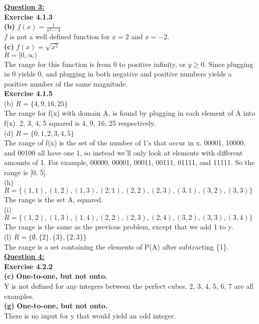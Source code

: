 \documentclass[12pt, letterpaper, twoside]{article}
\begin{document}
\noindent \textbf{\underline{Question 3:}}\\
\textbf{Exercise 4.1.3}\\
\textbf{(b)} $f(x) = \frac{1}{x^2 - 4}$\\
\break
$f$ is not a well defined function for $x = 2$ and $x = -2$.\\
\break
\textbf{(c)} $f(x) = \sqrt{x^2}$\\
\break
$R = [0, \infty)$\\
The range for this function is from 0 to positive infinity, or $y \geq 0$. Since plugging in 0 yields 0, and plugging in both negative and positive numbers yields a positive number of the same magnitude.\\
\break
\textbf{Exercise 4.1.5}\\
(b) $R = \{4, 9, 16, 25\}$\\
The range for f(x) with domain A, is found by plugging in each element of A into f(x). 2, 3, 4, 5 squared is 4, 9, 16, 25 respectively.\\
\break
(d) $R = \{0, 1, 2, 3, 4, 5\}$\\
The range of f(x) is the set of the number of 1's that occur in x. 00001, 10000, and 00100 all have one 1, so instead we'll only look at elements with different amounts of 1. For example, 00000, 00001, 00011, 00111, 01111, and 11111. So the range is [0, 5].\\
\break
(h) $R = \{(1, 1), (1, 2), (1, 3), (2, 1), (2, 2), (2, 3), (3, 1), (3, 2), (3, 3)\}$\\
The range is the set A, squared.\\
\break
(i) $R = \{(1, 2), (1, 3), (1, 4), (2, 2), (2, 3), (2, 4), (3, 2), (3, 3), (3, 4)\}$\\
The range is the same as the previous problem, except that we add 1 to y.\\
\break
(l) $R = \{\emptyset, \{2\}, \{3\}, \{2, 3\}\}$\\
The range is a set containing the elements of P(A) after subtracting \{1\}.\\
\break
\newpage
\noindent \textbf{\underline{Question 4:}}\\
\textbf{ Exercise 4.2.2}\\
\textbf{(c)} \textbf{One-to-one, but not onto.}\\ Y is not defined for any integers between the perfect cubes. 2, 3, 4, 5, 6, 7 are all examples.\\ 
\break
\textbf{(g)} \textbf{One-to-one, but not onto.}\\ There is no input for y that would yield an odd integer.\\
\end{document}
